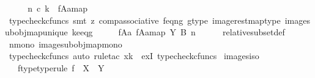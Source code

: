 \begin{isabellebody}
\isanewline
\ \ \isamarkupfalse%
\ \isamarkupfalse%
\ {\isachardoublequoteopen}n\ {\isasymcirc}\isactrlsub c\ k\ {\isacharequal}{\kern0pt}\ {\isacharbrackleft}{\kern0pt}f{\isasymlparr}A{\isasymrparr}\isactrlbsub a\isactrlesub {\isacharbrackright}{\kern0pt}map{\isachardoublequoteclose}\isanewline
\ \ \ \ \isamarkupfalse%
\ {\isacharparenleft}{\kern0pt}typecheck{\isacharunderscore}{\kern0pt}cfuncs{\isacharcomma}{\kern0pt}\ smt\ {\isacharparenleft}{\kern0pt}z{}{\isacharparenright}{\kern0pt}\ comp{\isacharunderscore}{\kern0pt}associative{}\ f{\isacharunderscore}{\kern0pt}eq{\isacharunderscore}{\kern0pt}ng\ g{\isacharunderscore}{\kern0pt}type\ image{\isacharunderscore}{\kern0pt}rest{\isacharunderscore}{\kern0pt}map{\isacharunderscore}{\kern0pt}type\ image{\isacharunderscore}{\kern0pt}subobj{\isacharunderscore}{\kern0pt}map{\isacharunderscore}{\kern0pt}unique\ k{\isacharunderscore}{\kern0pt}e{\isacharunderscore}{\kern0pt}eq{\isacharunderscore}{\kern0pt}g{\isacharparenright}{\kern0pt}\isanewline
\ \ \isamarkupfalse%
\ \isamarkupfalse%
\ {\isachardoublequoteopen}{\isacharparenleft}{\kern0pt}f{\isasymlparr}A{\isasymrparr}\isactrlbsub a\isactrlesub {\isacharcomma}{\kern0pt}\ {\isacharbrackleft}{\kern0pt}f{\isasymlparr}A{\isasymrparr}\isactrlbsub a\isactrlesub {\isacharbrackright}{\kern0pt}map{\isacharparenright}{\kern0pt}\ {\isasymsubseteq}\isactrlbsub Y\isactrlesub \ {\isacharparenleft}{\kern0pt}B{\isacharcomma}{\kern0pt}\ n{\isacharparenright}{\kern0pt}{\isachardoublequoteclose}\isanewline
\ \ \ \ \isamarkupfalse%
\ relative{\isacharunderscore}{\kern0pt}subset{\isacharunderscore}{\kern0pt}def{}\ \isamarkupfalse%
\ n{\isacharunderscore}{\kern0pt}mono\ image{\isacharunderscore}{\kern0pt}subobj{\isacharunderscore}{\kern0pt}map{\isacharunderscore}{\kern0pt}mono\isanewline
\ \ \ \ \isamarkupfalse%
\ {\isacharparenleft}{\kern0pt}typecheck{\isacharunderscore}{\kern0pt}cfuncs{\isacharcomma}{\kern0pt}\ auto{\isacharcomma}{\kern0pt}\ rule{\isacharunderscore}{\kern0pt}tac\ x{\isacharequal}{\kern0pt}k\ \ exI{\isacharcomma}{\kern0pt}\ typecheck{\isacharunderscore}{\kern0pt}cfuncs{\isacharparenright}{\kern0pt}\isanewline
{}\isamarkupfalse%
%
\endisatagproof
{\isafoldproof}%
%
\isadelimproof
\isanewline
%
\endisadelimproof
\isanewline
{}\isamarkupfalse%
\ images{\isacharunderscore}{\kern0pt}iso{\isacharcolon}{\kern0pt}\isanewline
\ \ \ f{\isacharunderscore}{\kern0pt}type{\isacharbrackleft}{\kern0pt}type{\isacharunderscore}{\kern0pt}rule{\isacharbrackright}{\kern0pt}{\isacharcolon}{\kern0pt}\ {\isachardoublequoteopen}f\ {\isacharcolon}{\kern0pt}\ X\ {\isasymrightarrow}\ Y{\isachardoublequoteclose}\isanewline

\end{isabellebody}
